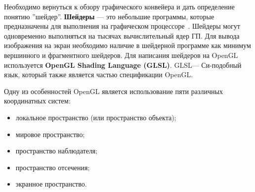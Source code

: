Необходимо вернуться к обзору графического конвейера и дать определение понятию
''шейдер''. \textbf{Шейдеры} --- это небольшие программы, которые предназначены
для выполнения на графическом процессоре~\cite{LearnOGL}. Шейдеры могут
одновременно выполняться на тысячах вычислительный ядер ГП. Для вывода
изображения на экран необходимо наличие в шейдерной программе как минимум
вершинного и фрагментного шейдеров. Для написания шейдеров на OpenGL
используется \textbf{OpenGL Shading Language (GLSL)}. GLSL\@--- Си-подобный язык,
который также является частью спецификации OpenGL\@.

Одну из особенностей OpenGL является использование пяти различных координатных
систем:
\begin{itemize}
    \item локальное пространство (или пространство объекта);
    \item мировое пространство;
    \item пространство наблюдателя;
    \item пространство отсечения;
    \item экранное пространство.
\end{itemize}


